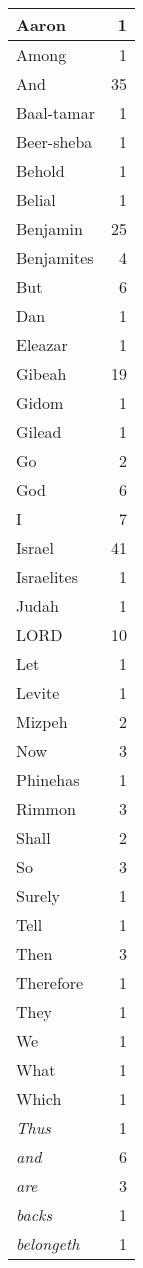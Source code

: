 \begin{center}
\begin{longtable}{l|r}
\hline \hline
\endlastfoot
Aaron & 1 \\ \hline
Among & 1 \\ \hline
And & 35 \\ \hline
Baal-tamar & 1 \\ \hline
Beer-sheba & 1 \\ \hline
Behold & 1 \\ \hline
Belial & 1 \\ \hline
Benjamin & 25 \\ \hline
Benjamites & 4 \\ \hline
But & 6 \\ \hline
Dan & 1 \\ \hline
Eleazar & 1 \\ \hline
Gibeah & 19 \\ \hline
Gidom & 1 \\ \hline
Gilead & 1 \\ \hline
Go & 2 \\ \hline
God & 6 \\ \hline
I & 7 \\ \hline
Israel & 41 \\ \hline
Israelites & 1 \\ \hline
Judah & 1 \\ \hline
LORD & 10 \\ \hline
Let & 1 \\ \hline
Levite & 1 \\ \hline
Mizpeh & 2 \\ \hline
Now & 3 \\ \hline
Phinehas & 1 \\ \hline
Rimmon & 3 \\ \hline
Shall & 2 \\ \hline
So & 3 \\ \hline
Surely & 1 \\ \hline
Tell & 1 \\ \hline
Then & 3 \\ \hline
Therefore & 1 \\ \hline
They & 1 \\ \hline
We & 1 \\ \hline
What & 1 \\ \hline
Which & 1 \\ \hline
\emph{Thus} & 1 \\ \hline
\emph{and} & 6 \\ \hline
\emph{are} & 3 \\ \hline
\emph{backs} & 1 \\ \hline
\emph{belongeth} & 1 \\ \hline

\end{longtable}
\end{center}
